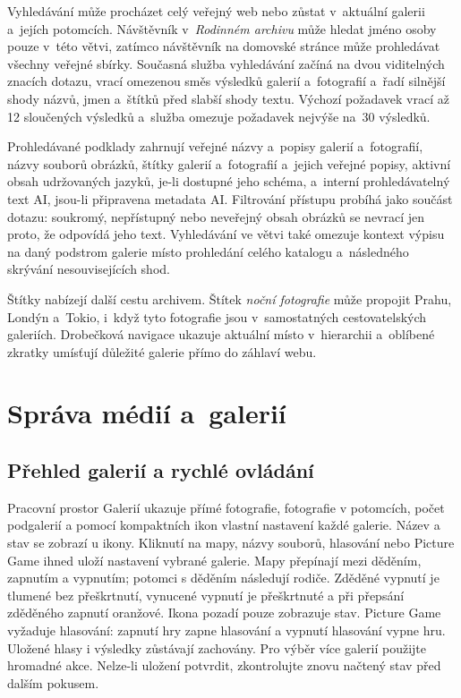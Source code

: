 \documentclass[11pt,a4paper]{article}
\begin{document}
Vyhledávání může procházet celý veřejný web nebo zůstat v~aktuální galerii
a~jejích potomcích. Návštěvník v~\emph{Rodinném archivu} může hledat jméno osoby
pouze v~této větvi, zatímco návštěvník na domovské stránce může prohledávat
všechny veřejné sbírky. Současná služba vyhledávání začíná na dvou viditelných
znacích dotazu, vrací omezenou směs výsledků galerií a~fotografií a~řadí
silnější shody názvů, jmen a~štítků před slabší shody textu. Výchozí požadavek
vrací až 12 sloučených výsledků a~služba omezuje požadavek nejvýše na~30
výsledků.

Prohledávané podklady zahrnují veřejné názvy a~popisy galerií a~fotografií,
názvy souborů obrázků, štítky galerií a~fotografií a~jejich veřejné popisy,
aktivní obsah udržovaných jazyků, je-li dostupné jeho schéma, a~interní
prohledávatelný text AI, jsou-li připravena metadata AI. Filtrování přístupu
probíhá jako součást dotazu: soukromý, nepřístupný nebo neveřejný obsah obrázků
se nevrací jen proto, že odpovídá jeho text. Vyhledávání ve větvi také omezuje
kontext výpisu na daný podstrom galerie místo prohledání celého katalogu
a~následného skrývání nesouvisejících shod.

Štítky nabízejí další cestu archivem. Štítek \emph{noční fotografie} může
propojit Prahu, Londýn a~Tokio, i~když tyto fotografie jsou v~samostatných
cestovatelských galeriích. Drobečková navigace ukazuje aktuální místo
v~hierarchii a~oblíbené zkratky umísťují důležité galerie přímo do záhlaví webu.
\section{Správa médií a~galerií}
\label{sec:admin}

\subsection{Přehled galerií a rychlé ovládání}
Pracovní prostor Galerií ukazuje přímé fotografie, fotografie v potomcích, počet
podgalerií a pomocí kompaktních ikon vlastní nastavení každé galerie. Název a
stav se zobrazí u ikony. Kliknutí na mapy, názvy souborů, hlasování nebo Picture
Game ihned uloží nastavení vybrané galerie. Mapy přepínají mezi děděním,
zapnutím a vypnutím; potomci s děděním následují rodiče. Zděděné vypnutí je
tlumené bez přeškrtnutí, vynucené vypnutí je přeškrtnuté a při přepsání
zděděného zapnutí oranžové. Ikona pozadí pouze
zobrazuje stav. Picture Game vyžaduje hlasování: zapnutí hry zapne hlasování a
vypnutí hlasování vypne hru. Uložené hlasy i výsledky zůstávají zachovány.
Pro výběr více galerií použijte hromadné akce. Nelze-li uložení potvrdit,
zkontrolujte znovu načtený stav před dalším pokusem.
\end{document}
